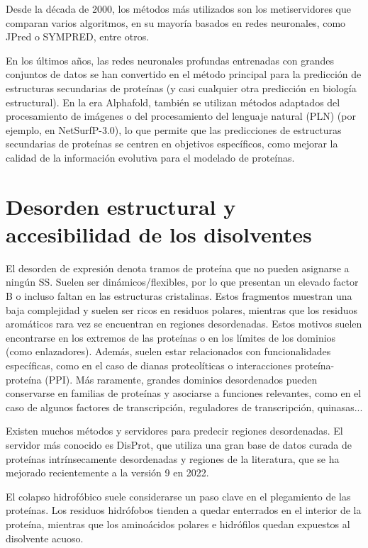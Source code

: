 Desde la década de 2000, los métodos más utilizados son los metiservidores que comparan varios algoritmos, en su mayoría basados en redes neuronales, como JPred o SYMPRED, entre otros.

En los últimos años, las redes neuronales profundas entrenadas con grandes conjuntos de datos se han convertido en el método principal para la predicción de estructuras secundarias de proteínas (y casi cualquier otra predicción en biología estructural). En la era Alphafold, también se utilizan métodos adaptados del procesamiento de imágenes o del procesamiento del lenguaje natural (PLN) (por ejemplo, en NetSurfP-3.0), lo que permite que las predicciones de estructuras secundarias de proteínas se centren en objetivos específicos, como mejorar la calidad de la información evolutiva para el modelado de proteínas.

\section{Desorden estructural y accesibilidad de los disolventes}
El desorden de expresión denota tramos de proteína que no pueden asignarse a ningún SS. Suelen ser dinámicos/flexibles, por lo que presentan un elevado factor B o incluso faltan en las estructuras cristalinas. Estos fragmentos muestran una baja complejidad y suelen ser ricos en residuos polares, mientras que los residuos aromáticos rara vez se encuentran en regiones desordenadas. Estos motivos suelen encontrarse en los extremos de las proteínas o en los límites de los dominios (como enlazadores). Además, suelen estar relacionados con funcionalidades específicas, como en el caso de dianas proteolíticas o interacciones proteína-proteína (PPI). Más raramente, grandes dominios desordenados pueden conservarse en familias de proteínas y asociarse a funciones relevantes, como en el caso de algunos factores de transcripción, reguladores de transcripción, quinasas...

Existen muchos métodos y servidores para predecir regiones desordenadas. El servidor más conocido es DisProt, que utiliza una gran base de datos curada de proteínas intrínsecamente desordenadas y regiones de la literatura, que se ha mejorado recientemente a la versión 9 en 2022.

El colapso hidrofóbico suele considerarse un paso clave en el plegamiento de las proteínas. Los residuos hidrófobos tienden a quedar enterrados en el interior de la proteína, mientras que los aminoácidos polares e hidrófilos quedan expuestos al disolvente acuoso.

